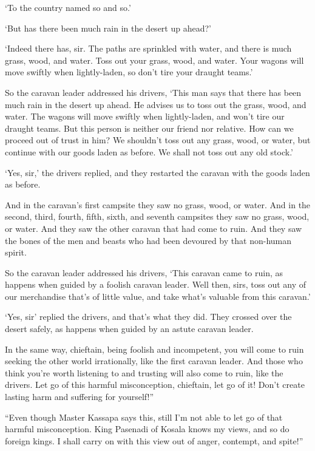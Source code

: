 \documentclass[12pt,openany]{book}%
\begin{document}
‘To the country named so and so.’ 

‘But has there been much rain in the desert up ahead?’ 

‘Indeed there has, sir. The paths are sprinkled with water, and there is much grass, wood, and water. Toss out your grass, wood, and water. Your wagons will move swiftly when lightly-laden, so don’t tire your draught teams.’ 

So the caravan leader addressed his drivers, ‘This man says that there has been much rain in the desert up ahead. He advises us to toss out the grass, wood, and water. The wagons will move swiftly when lightly-laden, and won’t tire our draught teams. But this person is neither our friend nor relative. How can we proceed out of trust in him? We shouldn’t toss out any grass, wood, or water, but continue with our goods laden as before. We shall not toss out any old stock.’ 

‘Yes, sir,’ the drivers replied, and they restarted the caravan with the goods laden as before. 

And in the caravan’s first campsite they saw no grass, wood, or water. And in the second, third, fourth, fifth, sixth, and seventh campsites they saw no grass, wood, or water. And they saw the other caravan that had come to ruin. And they saw the bones of the men and beasts who had been devoured by that non-human spirit. 

So the caravan leader addressed his drivers, ‘This caravan came to ruin, as happens when guided by a foolish caravan leader. Well then, sirs, toss out any of our merchandise that’s of little value, and take what’s valuable from this caravan.’ 

‘Yes, sir’ replied the drivers, and that’s what they did. They crossed over the desert safely, as happens when guided by an astute caravan leader. 

In the same way, chieftain, being foolish and incompetent, you will come to ruin seeking the other world irrationally, like the first caravan leader. And those who think you’re worth listening to and trusting will also come to ruin, like the drivers. Let go of this harmful misconception, chieftain, let go of it! Don’t create lasting harm and suffering for yourself!” 

“Even though Master Kassapa says this, still I’m not able to let go of that harmful misconception. King Pasenadi of Kosala knows my views, and so do foreign kings. I shall carry on with this view out of anger, contempt, and spite!” 
\end{document}
